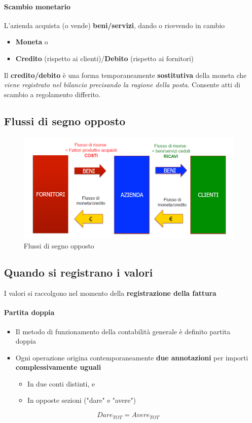 \documentclass[12pt]{article}
\begin{document}
\paragraph{Scambio monetario} L'azienda acquista (o vende) \textbf{beni/servizi}, dando o ricevendo in cambio
\begin{itemize}
    \item \textbf{Moneta} o
    \item \textbf{Credito} (rispetto ai clienti)/\textbf{Debito} (rispetto ai fornitori)
\end{itemize}
Il \textbf{credito/debito} è una forma temporaneamente \textbf{sostitutiva} della moneta che \textit{viene registrato nel bilancio precisando la ragione della posta}. Consente atti di scambio a regolamento differito.
\subsection{Flussi di segno opposto}
\begin{figure}[!htb]
    \centering
    \includegraphics[width=1\textwidth]{images/flussi.png}
    \caption{Flussi di segno opposto}
\end{figure}
\FloatBarrier
\subsection{Quando si registrano i valori} I valori si raccolgono nel momento della \textbf{registrazione della fattura}
\paragraph{Partita doppia}
\begin{itemize}
    \item Il metodo di funzionamento della contabilità generale è definito partita doppia
    \item Ogni operazione origina contemporaneamente \textbf{due annotazioni} per importi \textbf{complessivamente uguali}
          \begin{itemize}
              \item In due conti distinti, e
              \item In opposte sezioni ("dare" e "avere")
          \end{itemize}
\end{itemize}
$$Dare_{TOT} = Avere_{TOT}$$
\end{document}
